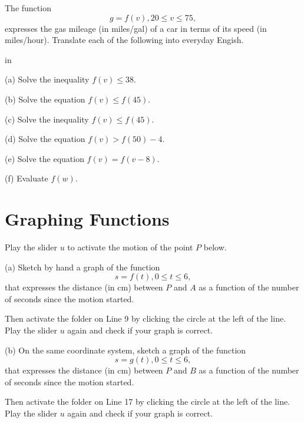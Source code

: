 \documentclass{ximera}
\newcommand{\pskip}{\vskip 0.1 in}
\begin{document}
\begin{example}  \label{ExFun2}

The function
\[
   g = f(v) , 20 \leq v \leq 75 ,
\]
expresses the gas mileage (in miles/gal) of a car in terms of its speed (in miles/hour). Translate each of the following into everyday Engish.

\pskip

\noindent (a) Solve the inequality $f(v)\leq 38$.

\noindent (b) Solve the equation $f(v) \leq f(45)$.

\noindent (c) Solve the inequality $f(v) \leq f(45)$.

\noindent (d) Solve the equation $f(v)> f(50)-4$.

\noindent (e) Solve the equation $f(v)=f(v-8)$.

\noindent (f) Evaluate $f(w)$.

\end{example}



\section{Graphing Functions}

\begin{exploration}\label{exp:Bugs1}
Play the slider $u$ to activate the motion of the point $P$ below.

(a) Sketch by hand a graph of the function 
\[
   s=f(t), 0\leq t \leq 6 ,
\] 
that expresses the distance (in cm) between $P$ and $A$ as a function of the number of seconds since the motion started.

Then activate the folder on Line 9 by clicking the circle at the left of the line. Play the slider $u$ again and check if your graph is correct.

(b) On the same coordinate system, sketch a graph of the function 
\[
   s=g(t), 0\leq t \leq 6 ,
\] 
that expresses the distance (in cm) between $P$ and $B$ as a function of the number of seconds since the motion started.

Then activate the folder on Line 17 by clicking the circle at the left of the line. Play the slider $u$ again and check if your graph is correct.


 
\begin{onlineOnly}
    \begin{center}
\end{center}
\end{onlineOnly}
\end{exploration}
\end{document}
